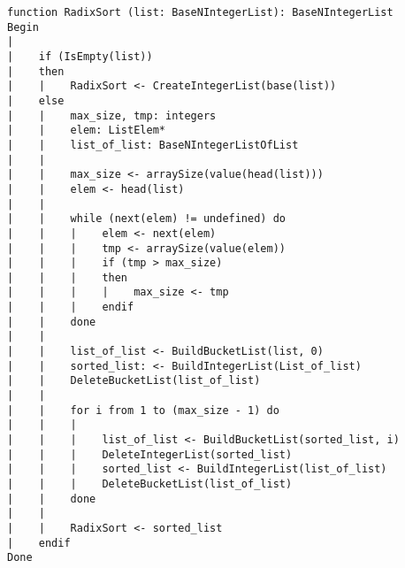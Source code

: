 \begin{lstlisting}[breaklines]
function RadixSort (list: BaseNIntegerList): BaseNIntegerList
Begin
|
|    if (IsEmpty(list))
|    then
|    |    RadixSort <- CreateIntegerList(base(list))
|    else
|    |    max_size, tmp: integers
|    |    elem: ListElem*
|    |    list_of_list: BaseNIntegerListOfList
|    |
|    |    max_size <- arraySize(value(head(list)))
|    |    elem <- head(list)
|    |
|    |    while (next(elem) != undefined) do
|    |    |    elem <- next(elem)
|    |    |    tmp <- arraySize(value(elem))
|    |    |    if (tmp > max_size)
|    |    |    then
|    |    |    |    max_size <- tmp
|    |    |    endif
|    |    done
|    |
|    |    list_of_list <- BuildBucketList(list, 0)
|    |    sorted_list: <- BuildIntegerList(List_of_list)
|    |    DeleteBucketList(list_of_list)
|    |
|    |    for i from 1 to (max_size - 1) do
|    |    |
|    |    |    list_of_list <- BuildBucketList(sorted_list, i)
|    |    |    DeleteIntegerList(sorted_list)
|    |    |    sorted_list <- BuildIntegerList(list_of_list)
|    |    |    DeleteBucketList(list_of_list)
|    |    done
|    |
|    |    RadixSort <- sorted_list
|    endif
Done
\end{lstlisting}
